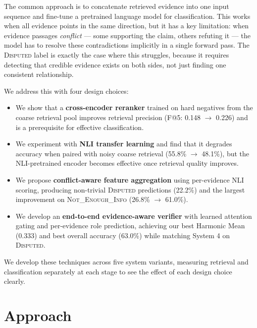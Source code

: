 \documentclass[11pt]{article}
\begin{document}
The common approach is to concatenate retrieved evidence into one input
sequence and fine-tune a pretrained language model for classification.
This works when all evidence points in the same direction, but it has
a key limitation: when evidence passages \emph{conflict} --- some
supporting the claim, others refuting it --- the model has to resolve
these contradictions implicitly in a single forward pass.
The \textsc{Disputed} label is exactly the case where this struggles,
because it requires detecting that credible evidence exists on both
sides, not just finding one consistent relationship.

We address this with four design choices:
\begin{itemize}
  \item We show that a \textbf{cross-encoder reranker} trained on
        hard negatives from the coarse retrieval pool improves
        retrieval precision (F@5: 0.148 $\to$ 0.226) and is a
        prerequisite for effective classification.
  \item We experiment with \textbf{NLI transfer learning} and find
        that it degrades accuracy when paired with noisy coarse
        retrieval (55.8\% $\to$ 48.1\%), but the NLI-pretrained
        encoder becomes effective once retrieval quality improves.
  \item We propose \textbf{conflict-aware feature aggregation} using
        per-evidence NLI scoring, producing non-trivial
        \textsc{Disputed} predictions (22.2\%) and the largest
        improvement on \textsc{Not\_Enough\_Info} (26.8\% $\to$
        61.0\%).
  \item We develop an \textbf{end-to-end evidence-aware verifier} with
        learned attention gating and per-evidence role prediction,
        achieving our best Harmonic Mean (0.333) and best overall
        accuracy (63.0\%) while matching System 4 on \textsc{Disputed}.
\end{itemize}

We develop these techniques across five system variants,
measuring retrieval and classification separately at each stage to
see the effect of each design choice clearly.

\section{Approach}
\end{document}
